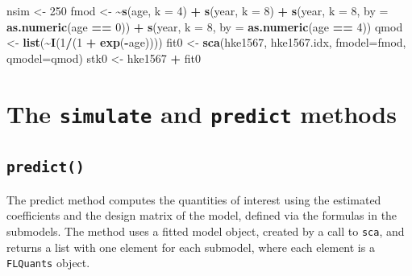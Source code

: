 \documentclass[
]{book}
\newenvironment{Shaded}{\begin{snugshade}}{\end{snugshade}}
\newcommand{\AttributeTok}[1]{\textcolor[rgb]{0.13,0.29,0.53}{#1}}
\newcommand{\DecValTok}[1]{\textcolor[rgb]{0.00,0.00,0.81}{#1}}
\newcommand{\ErrorTok}[1]{\textcolor[rgb]{0.64,0.00,0.00}{\textbf{#1}}}
\newcommand{\FunctionTok}[1]{\textcolor[rgb]{0.13,0.29,0.53}{\textbf{#1}}}
\newcommand{\NormalTok}[1]{#1}
\newcommand{\OtherTok}[1]{\textcolor[rgb]{0.56,0.35,0.01}{#1}}
\newcommand{\SpecialCharTok}[1]{\textcolor[rgb]{0.81,0.36,0.00}{\textbf{#1}}}
\begin{document}
\begin{Shaded}
\begin{Highlighting}[]
\NormalTok{nsim }\OtherTok{\textless{}{-}} \DecValTok{250}
\NormalTok{fmod }\OtherTok{\textless{}{-}} \ErrorTok{\textasciitilde{}}\FunctionTok{s}\NormalTok{(age, }\AttributeTok{k =} \DecValTok{4}\NormalTok{) }\SpecialCharTok{+}
    \FunctionTok{s}\NormalTok{(year, }\AttributeTok{k =} \DecValTok{8}\NormalTok{) }\SpecialCharTok{+}
    \FunctionTok{s}\NormalTok{(year, }\AttributeTok{k =} \DecValTok{8}\NormalTok{, }\AttributeTok{by =} \FunctionTok{as.numeric}\NormalTok{(age }\SpecialCharTok{==} \DecValTok{0}\NormalTok{)) }\SpecialCharTok{+}
    \FunctionTok{s}\NormalTok{(year, }\AttributeTok{k =} \DecValTok{8}\NormalTok{, }\AttributeTok{by =} \FunctionTok{as.numeric}\NormalTok{(age }\SpecialCharTok{==} \DecValTok{4}\NormalTok{))}
\NormalTok{qmod }\OtherTok{\textless{}{-}} \FunctionTok{list}\NormalTok{(}\SpecialCharTok{\textasciitilde{}}\FunctionTok{I}\NormalTok{(}\DecValTok{1}\SpecialCharTok{/}\NormalTok{(}\DecValTok{1} \SpecialCharTok{+} \FunctionTok{exp}\NormalTok{(}\SpecialCharTok{{-}}\NormalTok{age))))}
\NormalTok{fit0 }\OtherTok{\textless{}{-}} \FunctionTok{sca}\NormalTok{(hke1567, hke1567.idx, }\AttributeTok{fmodel=}\NormalTok{fmod, }\AttributeTok{qmodel=}\NormalTok{qmod)}
\NormalTok{stk0 }\OtherTok{\textless{}{-}}\NormalTok{ hke1567 }\SpecialCharTok{+}\NormalTok{ fit0}
\end{Highlighting}
\end{Shaded}

\hypertarget{the-simulate-and-predict-methods}{%
\section{\texorpdfstring{The \texttt{simulate} and \texttt{predict} methods}{The simulate and predict methods}}\label{the-simulate-and-predict-methods}}

\hypertarget{predict}{%
\subsection{\texorpdfstring{\texttt{predict()}}{predict()}}\label{predict}}

The predict method computes the quantities of interest using the estimated coefficients and the design matrix of the model, defined via the formulas in the submodels. The method uses a fitted model object, created by a call to \texttt{sca}, and returns a list with one element for each submodel, where each element is a \texttt{FLQuants} object.
\end{document}
